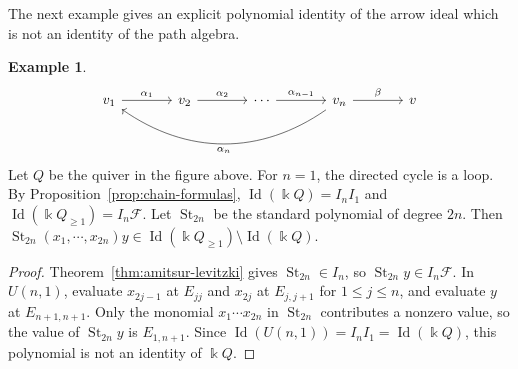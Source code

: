 \documentclass[11pt,reqno]{amsart}
\newcommand{\kk}{\Bbbk}
\newcommand{\F}{\mathcal F}
\newcommand{\Id}{\operatorname{Id}}
\newcommand{\st}{\operatorname{St}}
\theoremstyle{definition}
\newtheorem{example}[theorem]{Example}
\theoremstyle{remark}
\numberwithin{equation}{section}
\begin{document}
The next example gives an explicit polynomial identity of
the arrow ideal which is not an identity of the path algebra.


\begin{example}\label{ex:cycle-tail}
\[
\begin{tikzcd}[column sep=large]
v_1 \arrow[r,"\alpha_1"]
& v_2 \arrow[r,"\alpha_2"]
& \cdots \arrow[r,"\alpha_{n-1}"]
& v_n \arrow[lll,bend left=35,"\alpha_n"]
      \arrow[r,"\beta"]
& v
\end{tikzcd}
\]
Let $Q$ be the quiver in the figure above.
For $n=1$, the directed cycle is a loop.
By Proposition~\ref{prop:chain-formulas},
$\Id(\kk Q)=I_nI_1$ and $\Id(\kk Q_{\ge1})=I_n\F$.
Let
$
 \st_{2n}$
be the standard polynomial of degree $2n$. Then
$
 \st_{2n}(x_1,\cdots,x_{2n})y
 \in\Id(\kk Q_{\ge1})\setminus\Id(\kk Q)$.
\end{example}

\begin{proof}
Theorem~\ref{thm:amitsur-levitzki} gives
$\st_{2n}\in I_n$, so
$\st_{2n}y\in I_n\F$.
In $U(n,1)$, evaluate $x_{2j-1}$ at $E_{jj}$ and
$x_{2j}$ at $E_{j,j+1}$ for $1\le j\le n$,
and evaluate $y$ at $E_{n+1,n+1}$.
Only the monomial $x_1\cdots x_{2n}$ in $\st_{2n}$
contributes a nonzero value, so the value of $\st_{2n}y$
is $E_{1,n+1}$.
Since $\Id(U(n,1))=I_nI_1=\Id(\kk Q)$, this polynomial
is not an identity of $\kk Q$.
\end{proof}







\end{document}
